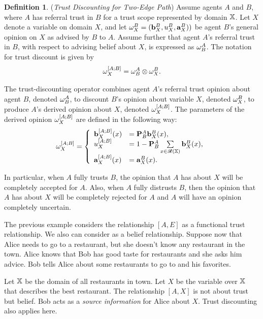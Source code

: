 \documentclass[a4paper,12pt]{article}
\theoremstyle{definition}
\newtheorem{definition}{Definition}[section]
\numberwithin{equation}{section}
\begin{document}
\begin{definition}
(\emph{Trust Discounting for Two-Edge Path}) Assume agents $A$ and $B$, where $A$ has referral trust in $B$ for a trust scope represented by domain $\mathbb{X}$. Let $X$ denote a variable on domain $X$, and let $\omega^{B}_{X} = (\mathbf{b}^{B}_{X}, u^{B}_{X}, \mathbf{a}^{B}_{X}))$ be agent $B$’s general opinion on $X$ as advised by $B$ to $A$. Assume further that agent $A$’s referral trust in $B$, with respect to advising belief about $X$, is expressed as $\omega^{A}_{B}$. The notation for trust discount is given by
\begin{equation}
	\omega^{[A;B]}_{X} = \omega^{A}_{B} \otimes \omega^{B}_{X} \text{.}
\end{equation}

The trust-discounting operator combines agent $A$’s referral trust opinion about agent $B$, denoted $\omega^{A}_{B}$, to discount $B$’s opinion about variable $X$, denoted $\omega^{B}_{X}$, to produce $A$’s derived opinion about $X$, denoted $\omega^{[A;B]}_{X}$. The parameters of the derived opinion $\omega^{[A;B]}_{X}$ are defined in the following way:
\begin{equation}
	\omega^{[A;B]}_{X} = \left\{
	\begin{array}{ll}
		\mathbf{b}^{[A;B]}_{X}(x) & = \mathbf{P}^{A}_{B} \mathbf{b}^{B}_{X}(x) \text{,}\\
		u^{[A;B]}_{X} & = 1 - \mathbf{P}^{A}_{B} \sum\limits_{x \in \mathcal{R}(\mathbb{X})} \mathbf{b}^{B}_{X}(x) \text{,} \\
		\mathbf{a}^{[A;B]}_{X}(x) & = \mathbf{a}^{B}_{X}(x) \text{.}
	\end{array}
	\right.
\end{equation}
\end{definition}

In particular, when $A$ fully trusts $B$, the opinion that $A$ has about $X$ will be completely accepted for $A$. Also, when $A$ fully distrusts $B$, then the opinion that $A$ has about $X$ will be completely rejected for $A$ and $A$ will have an opinion completely uncertain.

The previous example considers the relationship $[A, E]$ as a functional trust relationship. We also can consider as a belief relationship. Suppose now that Alice needs to go to a restaurant, but she doesn't know any restaurant in the town. Alice knows that Bob has good taste for restaurants and she asks him advice. Bob tells Alice about some restaurants to go to and his favorites.

Let $\mathbb{X}$ be the domain of all restaurants in town. Let $X$ be the variable over $\mathbb{X}$ that describes the best restaurant. The relationship $[A, X]$ is not about trust but belief. Bob acts as a \emph{source information} for Alice about $X$. Trust discounting also applies here.
\end{document}
